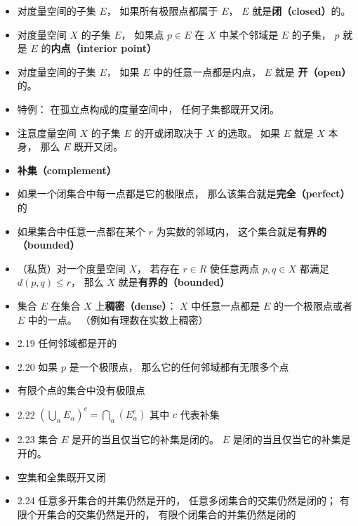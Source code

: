 \begin{itemize}
\item 对度量空间的子集 $E$， 如果所有极限点都属于 $E$， $E$ 就是\textbf{闭（closed）}的。

\item 对度量空间 $X$ 的子集 $E$， 如果点 $p \in E$ 在 $X$ 中某个邻域是 $E$ 的子集， $p$ 就是 $E$ 的\textbf{内点（interior point）}

\item 对度量空间的子集 $E$， 如果 $E$ 中的任意一点都是内点， $E$ 就是 \textbf{开（open）} 的。

\item 特例： 在孤立点构成的度量空间中， 任何子集都既开又闭。

\item 注意度量空间 $X$ 的子集 $E$ 的开或闭取决于 $X$ 的选取。 如果 $E$ 就是 $X$ 本身， 那么 $E$ 既开又闭。

\item \textbf{补集（complement）}

\item 如果一个闭集合中每一点都是它的极限点， 那么该集合就是\textbf{完全（perfect）} 的

\item 如果集合中任意一点都在某个 $r$ 为实数的邻域内， 这个集合就是\textbf{有界的（bounded）}

\item （私货）对一个度量空间 $X$， 若存在 $r\in R$ 使任意两点 $p,q\in X$ 都满足 $d(p,q) \leqslant r$， 那么 $X$ 就是\textbf{有界的（bounded）}

\item 集合 $E$ 在集合 $X$ 上\textbf{稠密（dense）}： $X$ 中任意一点都是 $E$ 的一个极限点或者 $E$ 中的一点。 （例如有理数在实数上稠密）

\item 2.19 任何邻域都是开的

\item 2.20 如果 $p$ 是一个极限点， 那么它的任何邻域都有无限多个点

\item 有限个点的集合中没有极限点

\item 2.22 $(\bigcup_\alpha E_\alpha)^c = \bigcap_\alpha (E_\alpha^c)$ 其中 $c$ 代表补集

\item 2.23 集合 $E$ 是开的当且仅当它的补集是闭的。 $E$ 是闭的当且仅当它的补集是开的。

\item 空集和全集既开又闭

\item 2.24 任意多开集合的并集仍然是开的， 任意多闭集合的交集仍然是闭的； 有限个开集合的交集仍然是开的， 有限个闭集合的并集仍然是闭的


\end{itemize}

